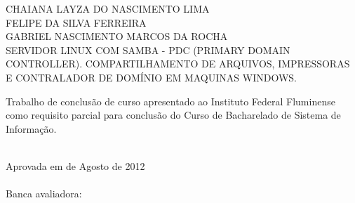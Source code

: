\begin{folhadeaprovacao}
    \setlength{\ABNTsignthickness}{0.4pt}
    \setlength{\ABNTsignwidth}{15cm}
    \setlength{\ABNTsignskip}{0.9cm}
    \begin{center}
	{\large CHAIANA LAYZA DO NASCIMENTO LIMA} \\
	{\large FELIPE DA SILVA FERREIRA} \\	
	{\large GABRIEL NASCIMENTO MARCOS DA ROCHA} \\ [4cm]
	{\large SERVIDOR LINUX COM SAMBA - PDC (PRIMARY DOMAIN CONTROLLER). COMPARTILHAMENTO DE ARQUIVOS, IMPRESSORAS E CONTRALADOR DE DOMÍNIO EM MAQUINAS WINDOWS.}\\ [2cm]
        \hspace{.45\textwidth} %
        \begin{minipage}{0.5\textwidth}
        \begin{espacosimples}
        Trabalho de conclusão de curso apresentado ao Instituto Federal Fluminense como requisito parcial para conclusão do Curso de Bacharelado de Sistema de Informação.\\\\
        \end{espacosimples}
        \end{minipage}
    \end{center}
    Aprovada em  de Agosto de 2012 \\\\
    Banca avaliadora:
\end{folhadeaprovacao}
